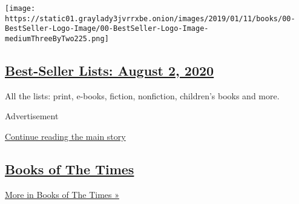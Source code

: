 \begin{enumerate}
  \texttt{[image: https://static01.graylady3jvrrxbe.onion/images/2019/01/11/books/00-BestSeller-Logo-Image/00-BestSeller-Logo-Image-mediumThreeByTwo225.png]}

  \hypertarget{best-seller-lists-august-2-2020}{%
  \subsection{\texorpdfstring{\href{/interactive/2020/01/29/books/review/best-sellers-promo-for-front-copy2.html}{Best-Seller
  Lists: August 2,
  2020}}{Best-Seller Lists: August 2, 2020}}\label{best-seller-lists-august-2-2020}}

  All the lists: print, e-books, fiction, nonfiction, children's books
  and more.
\end{enumerate}

Advertisement

\protect\hyperlink{after-mid1}{Continue reading the main story}

\hypertarget{books-of-the-times-2}{%
\subsection{\texorpdfstring{\href{/column/books-of-the-times}{Books of
The Times}}{Books of The Times}}\label{books-of-the-times-2}}

\href{/column/books-of-the-times}{More in Books of The Times »}

